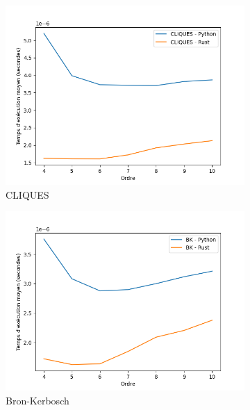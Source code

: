 \documentclass[12pt,a4paper]{article}
\begin{document}
\begin{figure}[ht]
  \centering
  \begin{subfigure}[b]{0.24\textwidth}
    \includegraphics[width=\textwidth]{images/delay_new_pyrust_CLIQUES_plot.png}
  \caption{CLIQUES}%
  \label{subfig:pr2_delay_cliques}
  \end{subfigure}
  \begin{subfigure}[b]{0.24\textwidth}
    \includegraphics[width=\textwidth]{images/delay_new_pyrust_BK_plot.png}
  \caption{Bron-Kerbosch}%
  \label{subfig:pr2_delay_bk}
  \end{subfigure}
  \begin{subfigure}[b]{0.24\textwidth}

\end{subfigure}
\end{figure}
\end{document}
